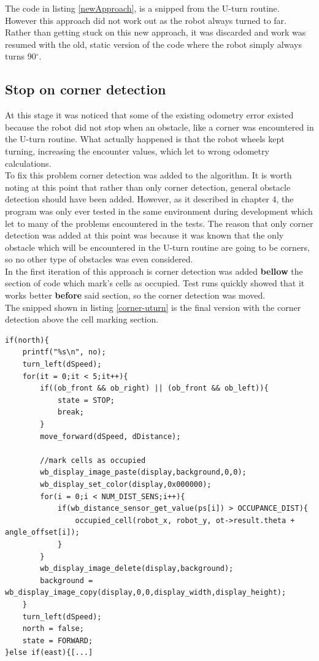 The code in listing \ref{newApproach}, is a snipped from the U-turn routine. \\
However this approach did not work out as the robot always turned to far. Rather than getting stuck on this new approach, it was discarded and work was resumed with the old, static version of the code where the robot simply always turns 90$^{\circ}$. \\

\subsection{Stop on corner detection}
At this stage it was noticed that some of the existing odometry error existed because the robot did not stop when an obstacle, like a corner was encountered in the U-turn routine. 
What actually happened is that the robot wheels kept turning, increasing the encounter values, which let to wrong odometry calculations. \\
To fix this problem corner detection was added to the algorithm. 
It is worth noting at this point that rather than only corner detection, general obstacle detection should have been added. However, as it described in chapter 4, the program was only ever tested in the same environment during development which let to many of the problems encountered in the tests. 
The reason that only corner detection was added at this point was because it was known that the only obstacle which will be encountered in the U-turn routine are going to be corners, so no other type of obstacles was even considered.\\[3ex]

In the first iteration of this approach is corner detection was added \textbf{bellow} the section of code which mark's cells as occupied. Test runs quickly showed that it works better \textbf{before} said section, so the corner detection was moved.\\
The snipped shown in listing \ref{corner-uturn} is the final version with the corner detection above the cell marking section.

\begin{lstlisting}[caption={Corner detection added to the U-turn routine}, label={corner-uturn}]
if(north){
	printf("%s\n", no);
	turn_left(dSpeed);
	for(it = 0;it < 5;it++){
		if((ob_front && ob_right) || (ob_front && ob_left)){
			state = STOP;
			break;
		}
		move_forward(dSpeed, dDistance);

		//mark cells as occupied
		wb_display_image_paste(display,background,0,0);
		wb_display_set_color(display,0x000000);
		for(i = 0;i < NUM_DIST_SENS;i++){
			if(wb_distance_sensor_get_value(ps[i]) > OCCUPANCE_DIST){
				occupied_cell(robot_x, robot_y, ot->result.theta + angle_offset[i]);
			}
		}
		wb_display_image_delete(display,background);
		background = wb_display_image_copy(display,0,0,display_width,display_height); 
	}
	turn_left(dSpeed);
	north = false;
	state = FORWARD;
}else if(east){[...]
\end{lstlisting}

